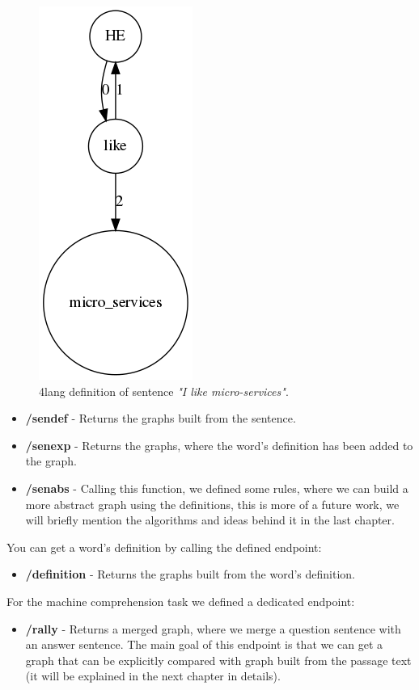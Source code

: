 \begin{figure}[!htb]
	\centering
	\includegraphics[scale=0.5]{figures/service}
	\caption{4lang definition of sentence \textit{"I like micro-services"}.}
	\label{fig:service}
\end{figure}

\begin{itemize}
	\item \textbf{/sendef} - Returns the graphs built from the sentence.
	\item \textbf{/senexp} - Returns the graphs, where the word's definition has been added to the graph.
	\item \textbf{/senabs} - Calling this function, we defined some rules, where we can build a more abstract graph using the definitions, this is more of a future work, we will briefly mention the algorithms and ideas behind it in the last chapter.
\end{itemize}
You can get a word's definition by calling the defined endpoint:
\begin{itemize}
	\item \textbf{/definition} - Returns the graphs built from the word's definition.
\end{itemize}
For the machine comprehension task we defined a dedicated endpoint:
\begin{itemize}
	\item \textbf{/rally} - Returns a merged graph, where we merge a question sentence with an answer sentence. The main goal of this endpoint is that we can get a graph that can be explicitly compared with graph built from the passage text (it will be explained in the next chapter in details). 
\end{itemize}


